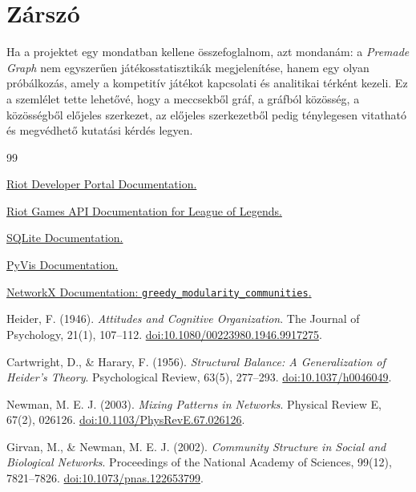 \documentclass[a4paper,12pt]{report}
\begin{document}
\section{Zárszó}

Ha a projektet egy mondatban kellene összefoglalnom, azt mondanám: a \emph{Premade Graph} nem egyszerűen játékosstatisztikák megjelenítése, hanem egy olyan próbálkozás, amely a kompetitív játékot kapcsolati és analitikai térként kezeli. Ez a szemlélet tette lehetővé, hogy a meccsekből gráf, a gráfból közösség, a közösségből előjeles szerkezet, az előjeles szerkezetből pedig ténylegesen vitatható és megvédhető kutatási kérdés legyen.

\begin{thebibliography}{99}

\href{https://developer.riotgames.com/docs/portal}{Riot Developer Portal Documentation.}

\href{https://developer.riotgames.com/docs/lol}{Riot Games API Documentation for League of Legends.}

\href{https://www.sqlite.org/docs.html}{SQLite Documentation.}

\href{https://pyvis.readthedocs.io/en/latest/documentation.html}{PyVis Documentation.}

\href{https://networkx.org/documentation/stable/reference/algorithms/generated/networkx.algorithms.community.modularity_max.greedy_modularity_communities.html}{NetworkX Documentation: \texttt{greedy\_modularity\_communities}.}

Heider, F. (1946). \textit{Attitudes and Cognitive Organization}. The Journal of Psychology, 21(1), 107--112. \href{https://doi.org/10.1080/00223980.1946.9917275}{doi:10.1080/00223980.1946.9917275}.

Cartwright, D., \& Harary, F. (1956). \textit{Structural Balance: A Generalization of Heider's Theory}. Psychological Review, 63(5), 277--293. \href{https://doi.org/10.1037/h0046049}{doi:10.1037/h0046049}.

Newman, M. E. J. (2003). \textit{Mixing Patterns in Networks}. Physical Review E, 67(2), 026126. \href{https://doi.org/10.1103/PhysRevE.67.026126}{doi:10.1103/PhysRevE.67.026126}.

Girvan, M., \& Newman, M. E. J. (2002). \textit{Community Structure in Social and Biological Networks}. Proceedings of the National Academy of Sciences, 99(12), 7821--7826. \href{https://doi.org/10.1073/pnas.122653799}{doi:10.1073/pnas.122653799}.


\end{thebibliography}
\end{document}
